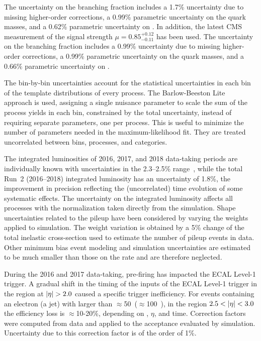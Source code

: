 The uncertainty on the \Htt branching fraction includes a 1.7\% uncertainty due to missing higher-order corrections, a 0.99\% parametric uncertainty on the quark masses, and a 0.62\% parametric uncertainty on \as. In addition, the latest CMS measurement of the \Htt signal strength $\mu = 0.85^{+0.12}_{-0.11}$ has been used. The uncertainty on the \HWW branching fraction includes a 0.99\% uncertainty due to missing higher-order corrections, a 0.99\% parametric uncertainty on the quark masses, and a 0.66\% parametric uncertainty on \as.

The bin-by-bin uncertainties account for the statistical uncertainties in each bin of the template distributions of every process. The Barlow-Beeston Lite~\cite{Conway:2011in, Barlow:1993dm} approach is used, assigning a single nuisance parameter to scale the sum of the process yields in each bin, constrained by the total uncertainty, instead of requiring separate parameters, one per process. This is useful to minimize the number of parameters needed in the maximum-likelihood fit. They are treated uncorrelated between bins, processes, and categories.

The integrated luminosities of 2016, 2017, and 2018 data-taking periods are individually known with uncertainties in the 2.3--2.5\% range~\cite{CMS:2017sdi, CMS:2018elu, CMS:2019jhq}, while the total Run~2 (2016--2018) integrated luminosity has an uncertainty of 1.8\%, the improvement in precision reflecting the (uncorrelated) time evolution of some systematic effects. The uncertainty on the integrated luminosity affects all processes with the normalization taken directly from the simulation. Shape uncertainties related to the pileup have been considered by varying the weights applied to simulation. The weight variation is obtained by a 5\% change of the total inelastic cross-section used to estimate the number of pileup events in data. Other minimum bias event modeling and simulation uncertainties are estimated to be much smaller than those on the rate and are therefore neglected.

During the 2016 and 2017 data-taking, pre-firing has impacted the ECAL Level-1 trigger. A gradual shift in the timing of the inputs of the ECAL Level-1 trigger in the region at $\lvert\eta\rvert > 2.0$ caused a specific trigger inefficiency. For events containing an electron (a jet) with \pt larger than $\approx$50~\GeV ($\approx$100~\GeV), in the region $2.5 < \lvert\eta\rvert < 3.0$ the efficiency loss is $\approx$10-20\%, depending on \pt, $\eta$, and time. Correction factors were computed from data and applied to the acceptance evaluated by simulation. Uncertainty due to this correction factor is of the order of 1\%.
